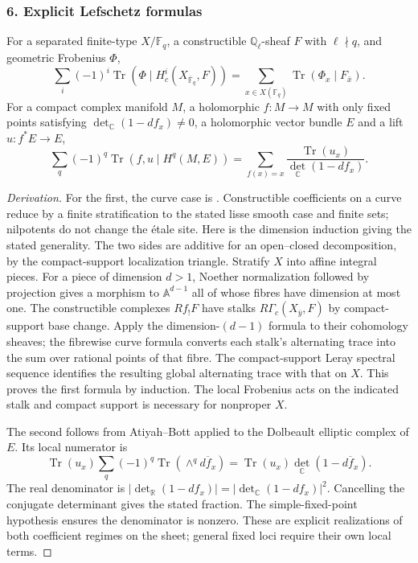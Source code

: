 \subsubsection{6. Explicit Lefschetz formulas}
\begin{proposition}\label{B:subject6}
For a separated finite-type $X/\mathbb F_q$, a constructible $\mathbb Q_\ell$-sheaf $F$ with $\ell\nmid q$, and geometric Frobenius $\Phi$,
\[
 \sum_i(-1)^i\operatorname{Tr}(\Phi\mid H_c^i(X_{\overline{\mathbb F}_q},F))
 =\sum_{x\in X(\mathbb F_q)}\operatorname{Tr}(\Phi_x\mid F_{\bar x}).
\]
For a compact complex manifold $M$, a holomorphic $f:M\to M$ with only fixed points satisfying $\det_{\mathbb C}(1-df_x)\ne0$, a holomorphic vector bundle $E$ and a lift $u:f^*E\to E$,
\[
 \sum_q(-1)^q\operatorname{Tr}(f,u\mid H^q(M,E))
 =\sum_{f(x)=x}\frac{\operatorname{Tr}(u_x)}{\det_{\mathbb C}(1-df_x)}.
\]
\end{proposition}
\begin{proof}[Derivation]
For the first, the curve case is \cite[Theorems 29.4 and 29.15]{BMilne2013}. Constructible coefficients on a curve reduce by a finite stratification to the stated lisse smooth case and finite sets; nilpotents do not change the \'etale site. Here is the dimension induction giving the stated generality. The two sides are additive for an open--closed decomposition, by the compact-support localization triangle. Stratify $X$ into affine integral pieces. For a piece of dimension $d>1$, Noether normalization followed by projection gives a morphism to $\mathbb A^{d-1}$ all of whose fibres have dimension at most one. The constructible complexes $Rf_!F$ have stalks $R\Gamma_c(X_{\bar y},F)$ by compact-support base change. Apply the dimension-$(d-1)$ formula to their cohomology sheaves; the fibrewise curve formula converts each stalk's alternating trace into the sum over rational points of that fibre. The compact-support Leray spectral sequence identifies the resulting global alternating trace with that on $X$. This proves the first formula by induction. The local Frobenius acts on the indicated stalk and compact support is necessary for nonproper $X$.

The second follows from Atiyah--Bott \cite[Theorem A, pp.~377--378]{BAtiyahBott1967} applied to the Dolbeault elliptic complex of $E$. Its local numerator is
\[
 \operatorname{Tr}(u_x)\sum_q(-1)^q\operatorname{Tr}(\wedge^q\overline{df_x})
 =\operatorname{Tr}(u_x)\det_{\mathbb C}(1-\overline{df_x}).
\]
The real denominator is $|\det_{\mathbb R}(1-df_x)|=|\det_{\mathbb C}(1-df_x)|^2$. Cancelling the conjugate determinant gives the stated fraction. The simple-fixed-point hypothesis ensures the denominator is nonzero. These are explicit realizations of both coefficient regimes on the sheet; general fixed loci require their own local terms.
\end{proof}

